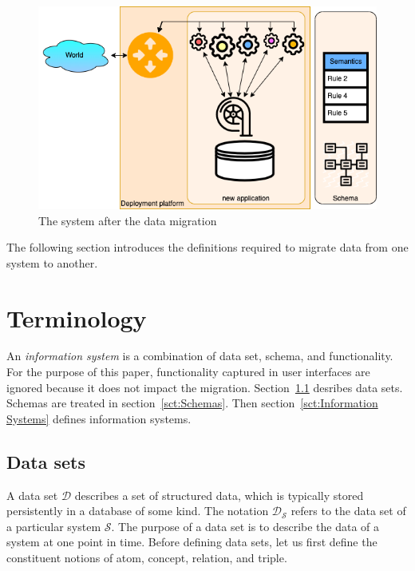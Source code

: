 \documentclass[runningheads]{llncs}
\newcommand{\dataset}{\mathscr{D}}
\newcommand{\infsys}{\mathscr{S}}
\begin{document}
\begin{figure}[bht]
   \begin{center}
     \includegraphics[scale=.35]{figures/datamigration-Post-migration.png}
   \end{center}
\caption{The system after the data migration}
\label{fig:post-migration}
\end{figure}

   The following section introduces the definitions required to migrate data from one system to another.

\section{Terminology}
\label{sct:Terminology}
   An {\em information system} is a combination of data set, schema, and functionality.
   For the purpose of this paper, functionality captured in user interfaces are ignored because it does not impact the migration.
   Section~\ref{sct:Data sets} desribes data sets. Schemas are treated in section~\ref{sct:Schemas}.
   Then section~\ref{sct:Information Systems} defines information systems.

\subsection{Data sets}
\label{sct:Data sets}
   A data set $\dataset$ describes a set of structured data, which is typically stored persistently in a database of some kind.
   The notation $\dataset_{\infsys}$ refers to the data set of a particular system $\infsys$.
   The purpose of a data set is to describe the data of a system at one point in time. 
   Before defining data sets, let us first define the constituent notions of atom, concept, relation, and triple.
   
\end{document}
